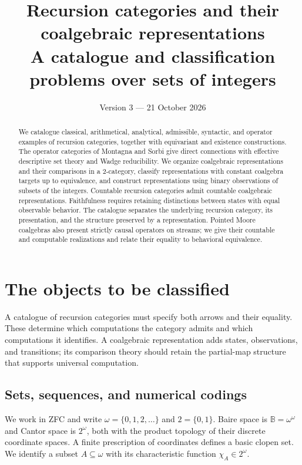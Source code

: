 \documentclass[11pt]{article}
\title{Recursion categories and their coalgebraic representations\\\large A catalogue and classification problems over sets of integers}
\author{}
\date{Version 3 --- 21 October 2026}
\theoremstyle{definition}
\newcommand{\Baire}{\mathbb B}
\begin{document}
\maketitle
\begin{abstract}
We catalogue classical, arithmetical, analytical, admissible, syntactic,
and operator examples of recursion categories, together with equivariant
and existence constructions. The operator categories of Montagna and
Sorbi give direct connections with effective descriptive set theory and
Wadge reducibility. We organize coalgebraic representations and their
comparisons in a 2-category, classify representations with constant
coalgebra targets up to equivalence, and construct representations using
binary observations of subsets of the integers. Countable recursion
categories admit countable coalgebraic representations. Faithfulness
requires retaining distinctions between states with equal observable
behavior. The catalogue separates the underlying recursion category,
its presentation, and the structure preserved by a representation.
Pointed Moore coalgebras also present strictly causal operators on
streams; we give their countable and computable realizations and relate
their equality to behavioral equivalence.
\end{abstract}

\section{The objects to be classified}

A catalogue of recursion categories must specify both arrows and their
equality. These determine which computations the category admits and
which computations it identifies. A coalgebraic representation adds
states, observations, and transitions; its comparison theory should
retain the partial-map structure that supports universal computation.

\subsection{Sets, sequences, and numerical codings}\label{sec:codes}
We work in ZFC and write $\omega=\{0,1,2,\ldots\}$ and
$2=\{0,1\}$. Baire space is $\Baire=\omega^\omega$ and Cantor
space is $2^\omega$, both with the product topology of their discrete
coordinate spaces. A finite prescription of coordinates defines a
basic clopen set. We identify a subset $A\subseteq\omega$ with its
characteristic function $\chi_A\in2^\omega$.
\end{document}
